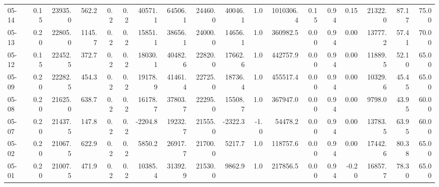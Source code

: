 \begin{threeparttable}
{\begin{tabular}{lrrrrrrrrrrrrrrrrr}
  05-14 &     0.15 & 23935.0 &             562.2 &               0.2 &                0.2 &            40571.1 & 64506.1 & 24460.0 &    40046.1 &                      1.0 &           1010306.4 &       0.15 &      0.94 &           0.15 &          21322.0 &           87.17 &                  75.00 \\
  05-13 &     0.20 & 22805.0 &            1145.7 &               0.2 &                0.2 &            15851.1 & 38656.1 & 24000.0 &    14656.1 &                      1.0 &            360982.5 &       0.00 &      0.94 &           0.00 &          13777.2 &           57.41 &                  70.00 \\
  05-12 &     0.15 & 22452.5 &             372.7 &               0.2 &                0.2 &            18030.1 & 40482.6 & 22820.0 &    17662.6 &                      1.0 &            442757.9 &       0.00 &      0.94 &           0.00 &          11889.5 &           52.10 &                  65.00 \\
  05-09 &     0.20 & 22282.5 &             454.3 &               0.2 &                0.2 &            19178.9 & 41461.4 & 22725.0 &    18736.4 &                      1.0 &            455517.4 &       0.00 &      0.94 &           0.00 &          10329.6 &           45.45 &                  65.00 \\
  05-08 &     0.20 & 21625.0 &             638.7 &               0.2 &                0.2 &            16178.7 & 37803.7 & 22295.0 &    15508.7 &                      1.0 &            367947.0 &       0.00 &      0.94 &           0.00 &           9798.0 &           43.95 &                  60.00 \\
  05-07 &     0.20 & 21437.5 &             147.8 &               0.2 &                0.2 &            -2204.8 & 19232.7 & 21555.0 &    -2322.3 &                     -1.0 &             54478.2 &       0.00 &      0.94 &           0.00 &          13783.5 &           63.95 &                  60.00 \\
  05-02 &     0.20 & 21067.5 &             622.9 &               0.2 &                0.2 &             5850.2 & 26917.7 & 21700.0 &     5217.7 &                      1.0 &            118757.6 &       0.00 &      0.94 &           0.00 &          17442.6 &           80.38 &                  65.00 \\
  05-01 &     0.20 & 21007.5 &             471.9 &               0.2 &                0.2 &            10385.4 & 31392.9 & 21530.0 &     9862.9 &                      1.0 &            217856.5 &       0.00 &      0.94 &          -0.20 &          16857.7 &           78.30 &                  65.00 \\

\end{tabular}}
\end{threeparttable}
